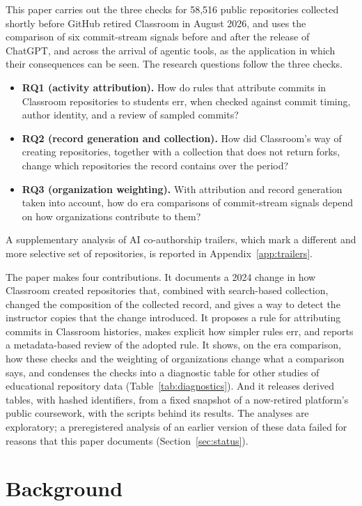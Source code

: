 \documentclass[acmsmall,screen,review,anonymous]{acmart}
\begin{document}
This paper carries out the three checks for 58,516 public repositories collected shortly before GitHub retired Classroom in August 2026, and uses the comparison of six commit-stream signals before and after the release of ChatGPT, and across the arrival of agentic tools, as the application in which their consequences can be seen. The research questions follow the three checks.

\begin{itemize}
\item \textbf{RQ1 (activity attribution).} How do rules that attribute commits in Classroom repositories to students err, when checked against commit timing, author identity, and a review of sampled commits?
\item \textbf{RQ2 (record generation and collection).} How did Classroom's way of creating repositories, together with a collection that does not return forks, change which repositories the record contains over the period?
\item \textbf{RQ3 (organization weighting).} With attribution and record generation taken into account, how do era comparisons of commit-stream signals depend on how organizations contribute to them?
\end{itemize}

\noindent A supplementary analysis of AI co-authorship trailers, which mark a different and more selective set of repositories, is reported in Appendix~\ref{app:trailers}.

The paper makes four contributions. It documents a 2024 change in how Classroom created repositories that, combined with search-based collection, changed the composition of the collected record, and gives a way to detect the instructor copies that the change introduced. It proposes a rule for attributing commits in Classroom histories, makes explicit how simpler rules err, and reports a metadata-based review of the adopted rule. It shows, on the era comparison, how these checks and the weighting of organizations change what a comparison says, and condenses the checks into a diagnostic table for other studies of educational repository data (Table~\ref{tab:diagnostics}). And it releases derived tables, with hashed identifiers, from a fixed snapshot of a now-retired platform's public coursework, with the scripts behind its results. The analyses are exploratory; a preregistered analysis of an earlier version of these data failed for reasons that this paper documents (Section~\ref{sec:status}).

\section{Background}
\label{sec:background}
\end{document}

